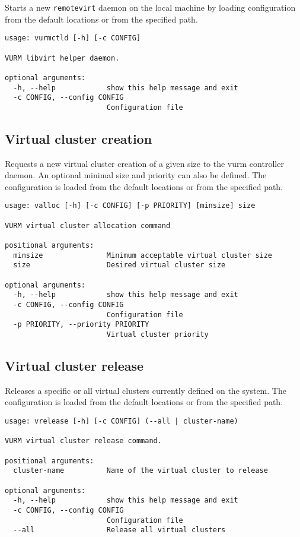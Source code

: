 Starts a new \texttt{remotevirt} daemon on the local machine by loading configuration from the default locations or from the specified path.

\begin{lstlisting}
usage: vurmctld [-h] [-c CONFIG]

VURM libvirt helper daemon.

optional arguments:
  -h, --help            show this help message and exit
  -c CONFIG, --config CONFIG
                        Configuration file
\end{lstlisting}

\subsection{Virtual cluster creation}

Requests a new virtual cluster creation of a given size to the \gls{vurm} controller daemon. An optional minimal size and priority can also be defined. The configuration is loaded from the default locations or from the specified path.

\begin{lstlisting}
usage: valloc [-h] [-c CONFIG] [-p PRIORITY] [minsize] size

VURM virtual cluster allocation command

positional arguments:
  minsize               Minimum acceptable virtual cluster size
  size                  Desired virtual cluster size

optional arguments:
  -h, --help            show this help message and exit
  -c CONFIG, --config CONFIG
                        Configuration file
  -p PRIORITY, --priority PRIORITY
                        Virtual cluster priority
\end{lstlisting}

\subsection{Virtual cluster release}

Releases a specific or all virtual clusters currently defined on the system. The configuration is loaded from the default locations or from the specified path.

\begin{lstlisting}
usage: vrelease [-h] [-c CONFIG] (--all | cluster-name)

VURM virtual cluster release command.

positional arguments:
  cluster-name          Name of the virtual cluster to release

optional arguments:
  -h, --help            show this help message and exit
  -c CONFIG, --config CONFIG
                        Configuration file
  --all                 Release all virtual clusters
\end{lstlisting}

